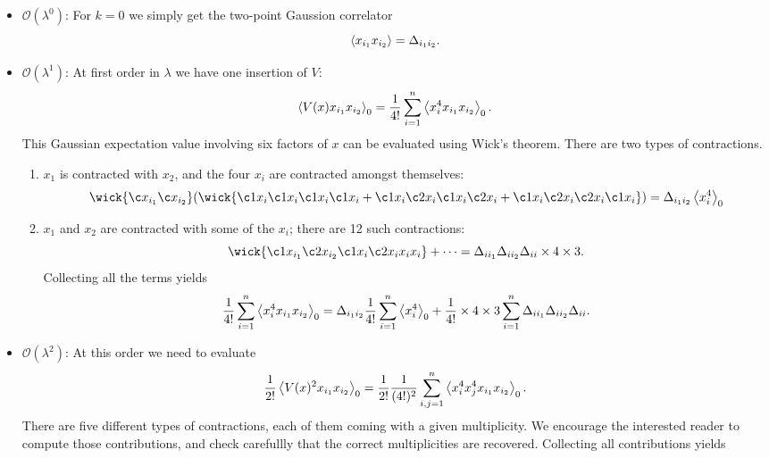 \documentclass{article}
\numberwithin{equation}{section}
\begin{document}
\begin{itemize}
    \item $\mathcal{O}(\lambda^0)$: For $k=0$ we simply get the two-point Gaussion correlator
    \begin{equation}
        \ev{x_{i_1}x_{i_2}} = \Delta_{i_1 i_2}.
    \end{equation}
    \item $\mathcal{O}(\lambda^1)$: At first order in $\lambda$ we have one insertion of $V$:
    \begin{equation}
        \ev{V(x)x_{i_1} x_{i_2}}_0 = \frac{1}{4!} \sum_{i = 1}^n \ev{x_i^4 x_{i_1} x_{i_2}}_0.
    \end{equation}
    This Gaussian expectation value involving six factors of $x$ can be evaluated using Wick's theorem. There are two types of contractions.
    \begin{enumerate}
        \item $x_1$ is contracted with $x_2$, and the four $x_i$ are contracted amongst themselves:
        \begin{equation}
            \wick{\c x_{i_1} \c x_{i_2}}(\wick{\c1 x_i \c1 x_i \c1 x_i \c1 x_i + \c1 x_i \c2 x_i \c1 x_i \c2 x_i + \c1 x_i \c2 x_i \c2 x_i \c1 x_i}) = \Delta_{i_1 i_2} \ev{x_i^4}_0
        \end{equation}
        \item $x_1$ and $x_2$ are contracted with some of the $x_i$; there are 12 such contractions:
        \begin{equation}
            \wick{\c1 x_{i_1} \c2 x_{i_2} \c1 x_i \c2 x_i x_i x_i} + \dots = \Delta_{i i_1} \Delta_{i i_2} \Delta_{ii} \times 4 \times 3.
        \end{equation}
        Collecting all the terms yields
        \begin{equation}
            \frac{1}{4!} \sum_{i = 1}^n \ev{x_i^4 x_{i_1} x_{i_2}}_0 = \Delta_{i_1 i_2} \frac{1}{4!} \sum_{i = 1}^n \ev{x_i^4}_0 + \frac{1}{4!} \times 4 \times 3 \sum_{i=1}^n \Delta_{i i_1} \Delta_{i i_2} \Delta_{ii}.
        \end{equation}
    \end{enumerate}
    \item $\mathcal{O}(\lambda^2)$: At this order we need to evaluate
    \begin{equation}
        \frac{1}{2!}\ev{V(x)^2 x_{i_1} x_{i_2}}_0 = \frac{1}{2!} \frac{1}{(4!)^2} \sum_{i,j=1}^n \ev{x_i^4 x_j^4 x_{i_1} x_{i_2}}_0.
    \end{equation}
    There are five different types of contractions, each of them coming with a given multiplicity. We encourage the interested reader to compute those contributions, and check carefullly that the correct multiplicities are recovered. Collecting all contributions yields

\end{itemize}
\end{document}
